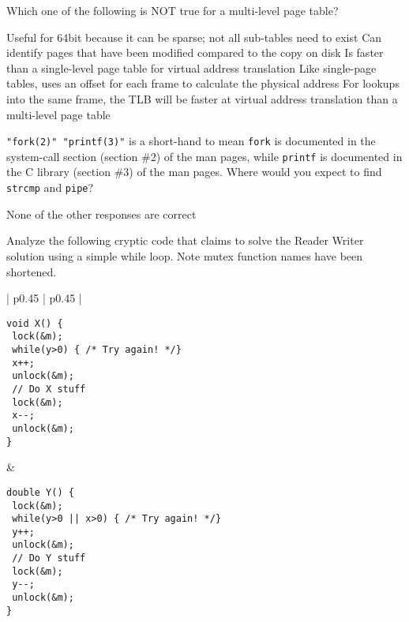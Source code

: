 \variant
Which one of the following is NOT true for a multi-level page table?
\begin{answers}
\answer Useful for 64bit because it can be sparse; not all sub-tables need to exist
\answer Can identify pages that have been modified compared to the copy on disk
\correctanswer Is faster than a single-level page table for virtual address translation
\answer Like single-page tables, uses an offset for each frame to calculate the physical address
\answer For lookups into the same frame, the TLB will be faster at virtual address translation than a multi-level page table 
\end{answers}
\begin{solution}
\end{solution}



\variant
{\tt "fork(2)" "printf(3)"} is a short-hand to mean {\tt fork} is documented in the system-call section (section \#2) of the man pages, while {\tt printf} is documented in the C library (section \#3) of the man pages. Where would you expect to find {\tt strcmp} and {\tt pipe}?
\begin{answers}
\answer None of the other responses are correct
\end{answers}
\begin{solution}
\end{solution}



\variant
Analyze the following cryptic code that claims to solve the Reader Writer solution using a simple while loop. Note mutex function names have been shortened.

\begin{tabular}{ | p{} | p{} | }
\hline \begin{verbatim}void X() {
 lock(&m);
 while(y>0) { /* Try again! */} 
 x++;
 unlock(&m);
 // Do X stuff
 lock(&m);
 x--;
 unlock(&m);
} \end{verbatim} & \begin{verbatim}
double Y() { 
 lock(&m);
 while(y>0 || x>0) { /* Try again! */} 
 y++;
 unlock(&m);
 // Do Y stuff
 lock(&m);
 y--;
 unlock(&m);
}\end{verbatim} \\ \hline
\end{tabular}

